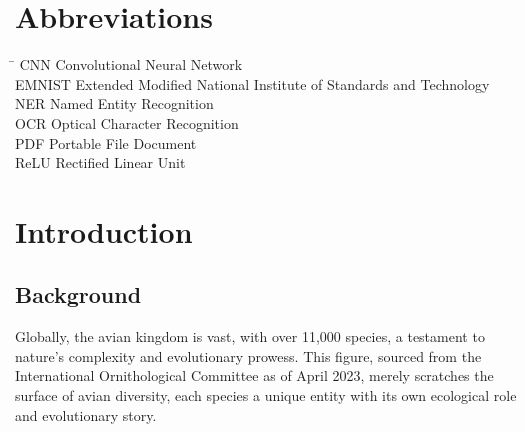 


\chapter*{Abbreviations}
\begin{tabbing}
\hspace{50mm}\=\kill
CNN \>  Convolutional Neural Network \\
EMNIST \> Extended Modified National Institute of Standards and Technology\\
NER \> Named Entity Recognition\\
OCR \> Optical Character Recognition\\
PDF \> Portable File Document\\
ReLU \> Rectified Linear Unit\\
\end{tabbing}
\newpage
{}

\chapter{Introduction}
\section{Background}\label{sec:bkgrnd}%
Globally, the avian kingdom is vast, with over 11,000 species, a testament to nature's complexity and evolutionary prowess. This figure, sourced from the International Ornithological Committee as of April 2023, merely scratches the surface of avian diversity, each species a unique entity with its own ecological role and evolutionary story.\cite{ioc_updates}

